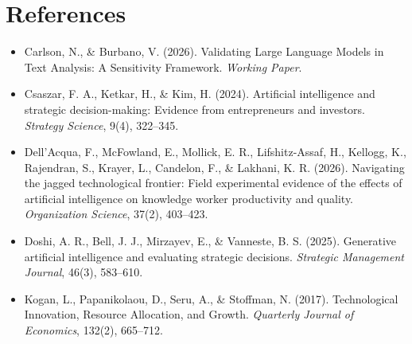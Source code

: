 \documentclass[11pt]{article}
\begin{document}
\section*{References}
\begin{itemize}
    \item Carlson, N., \& Burbano, V. (2026). Validating Large Language Models in Text Analysis: A Sensitivity Framework. \textit{Working Paper}.
    \item Csaszar, F. A., Ketkar, H., \& Kim, H. (2024). Artificial intelligence and strategic decision-making: Evidence from entrepreneurs and investors. \textit{Strategy Science}, 9(4), 322--345.
    \item Dell'Acqua, F., McFowland, E., Mollick, E. R., Lifshitz-Assaf, H., Kellogg, K., Rajendran, S., Krayer, L., Candelon, F., \& Lakhani, K. R. (2026). Navigating the jagged technological frontier: Field experimental evidence of the effects of artificial intelligence on knowledge worker productivity and quality. \textit{Organization Science}, 37(2), 403--423.
    \item Doshi, A. R., Bell, J. J., Mirzayev, E., \& Vanneste, B. S. (2025). Generative artificial intelligence and evaluating strategic decisions. \textit{Strategic Management Journal}, 46(3), 583--610.
    \item Kogan, L., Papanikolaou, D., Seru, A., \& Stoffman, N. (2017). Technological Innovation, Resource Allocation, and Growth. \textit{Quarterly Journal of Economics}, 132(2), 665--712.
\end{itemize}
\end{document}
